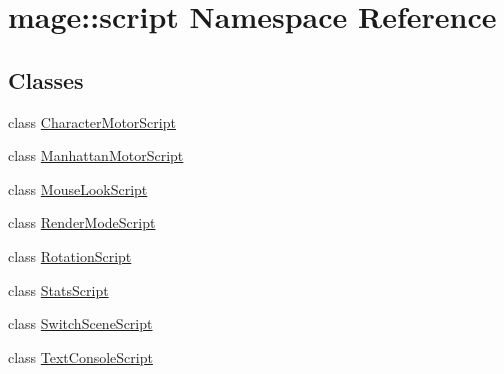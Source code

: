 \hypertarget{namespacemage_1_1script}{}\section{mage\+:\+:script Namespace Reference}
\label{namespacemage_1_1script}
\subsection*{Classes}
\begin{DoxyCompactItemize}
\item 
class \hyperlink{classmage_1_1script_1_1_character_motor_script}{Character\+Motor\+Script}
\item 
class \hyperlink{classmage_1_1script_1_1_manhattan_motor_script}{Manhattan\+Motor\+Script}
\item 
class \hyperlink{classmage_1_1script_1_1_mouse_look_script}{Mouse\+Look\+Script}
\item 
class \hyperlink{classmage_1_1script_1_1_render_mode_script}{Render\+Mode\+Script}
\item 
class \hyperlink{classmage_1_1script_1_1_rotation_script}{Rotation\+Script}
\item 
class \hyperlink{classmage_1_1script_1_1_stats_script}{Stats\+Script}
\item 
class \hyperlink{classmage_1_1script_1_1_switch_scene_script}{Switch\+Scene\+Script}
\item 
class \hyperlink{classmage_1_1script_1_1_text_console_script}{Text\+Console\+Script}
\end{DoxyCompactItemize}
